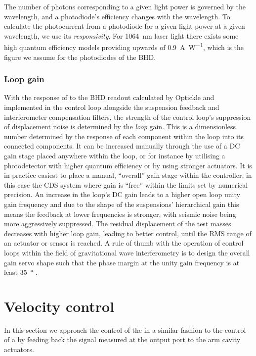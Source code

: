 The number of photons corresponding to a given light power is governed by the wavelength, and a photodiode's efficiency changes with the wavelength. To calculate the photocurrent from a photodiode for a given light power at a given wavelength, we use its \emph{responsivity}. For \SI{1064}{\nano\meter} laser light there exists some high quantum efficiency models providing upwards of \SI{0.9}{\ampere\per\watt}, which is the figure we assume for the photodiodes of the \gls{BHD}.

\subsubsection{Loop gain}
With the response of \LMINUS{} to the \gls{BHD} readout calculated by Optickle and implemented in the control loop alongside the suspension feedback and interferometer compensation filters, the strength of the control loop's suppression of displacement noise is determined by the \emph{loop} gain. This is a dimensionless number determined by the response of each component within the loop into its connected components. It can be increased manually through the use of a \gls{DC} gain stage placed anywhere within the loop, or for instance by utilising a photodetector with higher quantum efficiency or by using stronger actuators. It is in practice easiest to place a manual, ``overall'' gain stage within the controller, in this case the \gls{CDS} system where gain is ``free'' within the limits set by numerical precision. An increase in the loop's \gls{DC} gain leads to a higher open loop unity gain frequency and due to the shape of the suspensions' hierarchical gain this means the feedback at lower frequencies is stronger, with seismic noise being more aggressively suppressed. The residual displacement of the test masses decreases with higher loop gain, leading to better control, until the \gls{RMS} range of an actuator or sensor is reached. A rule of thumb with the operation of control loops within the field of gravitational wave interferometry is to design the overall gain servo shape such that the phase margin at the unity gain frequency is at least \SI{35}{\degree} \cite{Freise2003}.

\section{\label{sec:velocity-control}Velocity control}
In this section we approach the control of the \SSM{} in a similar fashion to the control of a \MI{} by feeding back the signal measured at the output port to the arm cavity actuators.

